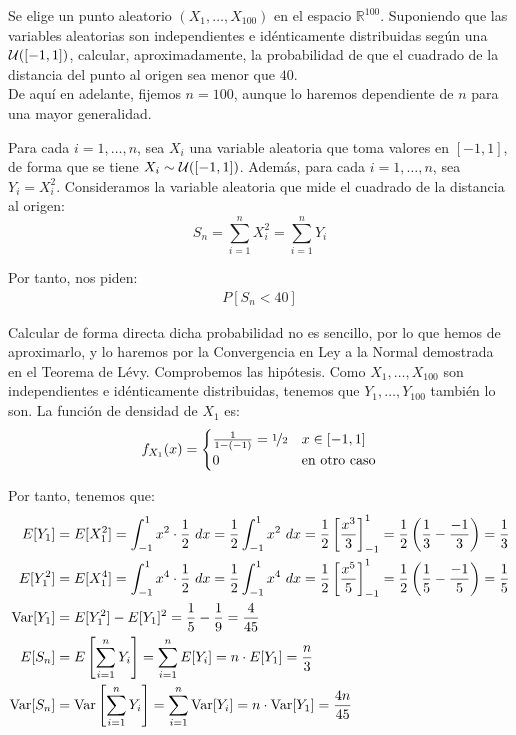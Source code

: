 \begin{ejercicio}
    Se elige un punto aleatorio $(X_1, \ldots, X_{100})$ en el espacio $\mathbb{R}^{100}$. Suponiendo que las variables aleatorias son independientes e idénticamente distribuidas según una $\mathcal{U}([-1, 1])$, calcular, aproximadamente, la probabilidad de que el cuadrado de la distancia del punto al origen sea menor que $40$.\\

    De aquí en adelante, fijemos $n=100$, aunque lo haremos dependiente de $n$ para una mayor generalidad.

    Para cada $i=1, \ldots, n$, sea $X_i$ una variable aleatoria que toma valores en $[-1, 1]$, de forma que se tiene $X_i \sim \mathcal{U}([-1, 1])$. Además, para cada $i=1, \ldots, n$, sea $Y_i = X_i^2$. Consideramos la variable aleatoria que mide el cuadrado de la distancia al origen:
    \[
        S_{n} = \sum_{i=1}^{n} X_i^2 = \sum_{i=1}^{n} Y_i
    \]

    Por tanto, nos piden:
    \begin{align*}
        P[S_{n} < 40]
    \end{align*}

    Calcular de forma directa dicha probabilidad no es sencillo, por lo que hemos de aproximarlo, y lo haremos por la Convergencia en Ley a la Normal demostrada en el Teorema de Lévy. Comprobemos las hipótesis. Como $X_1, \ldots, X_{100}$ son independientes e idénticamente distribuidas, tenemos que $Y_1, \ldots, Y_{100}$ también lo son. La función de densidad de $X_1$ es:
    \[
        f_{X_1}(x) = \begin{cases}
            \frac{1}{1-(-1)} = \nicefrac{1}{2}& x \in \left[-1, 1\right]\\
            0 & \text{en otro caso}
        \end{cases}
    \]
    
    Por tanto, tenemos que:
    \begin{align*}
        E[Y_1] &= E[X_1^2] = \int_{-1}^{1} x^2 \cdot \frac{1}{2} \ dx= \frac{1}{2} \int_{-1}^{1} x^2 \ dx = \frac{1}{2} \left[\frac{x^3}{3}\right]_{-1}^{1} = \frac{1}{2} \left(\frac{1}{3} - \frac{-1}{3}\right) = \frac{1}{3}\\
        E[Y_1^2] &= E[X_1^4] = \int_{-1}^{1} x^4 \cdot \frac{1}{2} \ dx= \frac{1}{2} \int_{-1}^{1} x^4 \ dx = \frac{1}{2} \left[\frac{x^5}{5}\right]_{-1}^{1} = \frac{1}{2} \left(\frac{1}{5} - \frac{-1}{5}\right) = \frac{1}{5}\\
        \Var[Y_1] &= E[Y_1^2] - E[Y_1]^2 = \frac{1}{5} - \frac{1}{9} = \frac{4}{45}\\
        E[S_{n}] &= E\left[\sum_{i=1}^{n} Y_i\right] = \sum_{i=1}^{n} E[Y_i] = n \cdot E[Y_1] = \frac{n}{3}\\
        \Var[S_{n}] &= \Var\left[\sum_{i=1}^{n} Y_i\right] = \sum_{i=1}^{n} \Var[Y_i] = n \cdot \Var[Y_1] = \frac{4n}{45}
    \end{align*}


\end{ejercicio}
